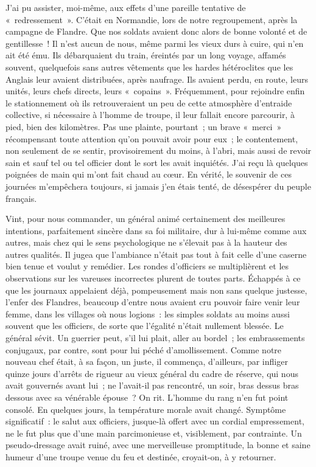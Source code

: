\documentclass[french,twoside]{book} %
\begin{document}
J’ai pu assister, moi-même, aux effets d’une pareille tentative de « redressement ». C’était en Normandie, lors de notre regroupement, après la campagne de Flandre. Que nos soldats avaient donc alors de bonne volonté et de gentillesse ! Il n’est aucun de nous, même parmi les vieux durs à cuire, qui n’en ait été ému. Ils débarquaient du train, éreintés par un long voyage, affamés souvent, quelquefois sans autres vêtements que les hardes hétéroclites que les Anglais leur avaient distribuées, après naufrage. Ils avaient perdu, en route, leurs unités, leurs chefs directs, leurs « copains ». Fréquemment, pour rejoindre enfin le stationnement où ils retrouveraient un peu de cette atmosphère d’entraide collective, si nécessaire à l’homme de troupe, il leur fallait encore parcourir, à pied, bien des kilomètres. Pas une plainte, pourtant ; un brave « merci » récompensant toute attention qu’on pouvait avoir pour eux ; le contentement, non seulement de se sentir, provisoirement du moins, à l’abri, mais aussi de revoir sain et sauf tel ou tel officier dont   le sort les avait inquiétés. J’ai reçu là quelques poignées de main qui m’ont fait chaud au cœur. En vérité, le souvenir de ces journées m’empêchera toujours, si jamais j’en étais tenté, de désespérer du peuple français.\par
Vint, pour nous commander, un général animé certainement des meilleures intentions, parfaitement sincère dans sa foi militaire, dur à lui-même comme aux autres, mais chez qui le sens psychologique ne s’élevait pas à la hauteur des autres qualités. Il jugea que l’ambiance n’était pas tout à fait celle d’une caserne bien tenue et voulut y remédier. Les rondes d’officiers se multiplièrent et les observations sur les vareuses incorrectes plurent de toutes parts. Échappés à ce que les journaux appelaient déjà, pompeusement mais non sans quelque justesse, l’enfer des Flandres, beaucoup d’entre nous avaient cru pouvoir faire venir leur femme, dans les villages où nous logions : les simples soldats au moins aussi souvent que les officiers, de sorte que l’égalité n’était nullement blessée. Le général sévit. Un guerrier peut, s’il lui plait, aller au bordel ; les embrassements conjugaux, par contre, sont pour lui péché d’amollissement. Comme notre nouveau chef était, à sa façon, un juste, il commença, d’ailleurs, par infliger quinze jours d’arrêts de rigueur au vieux général du cadre de réserve, qui nous avait gouvernés avant lui ; ne l’avait-il pas rencontré, un soir, bras dessus bras dessous avec sa vénérable épouse ? On rit. L’homme du rang n’en fut point consolé. En quelques jours, la température morale avait changé. Symptôme significatif : le salut aux officiers, jusque-là offert avec un cordial empressement, ne le fut plus que d’une main parcimonieuse et, visiblement, par contrainte. Un pseudo-dressage avait ruiné, avec une merveilleuse promptitude, la bonne et saine humeur d’une troupe venue du feu et destinée, croyait-on, à y retourner.\par
\end{document}
